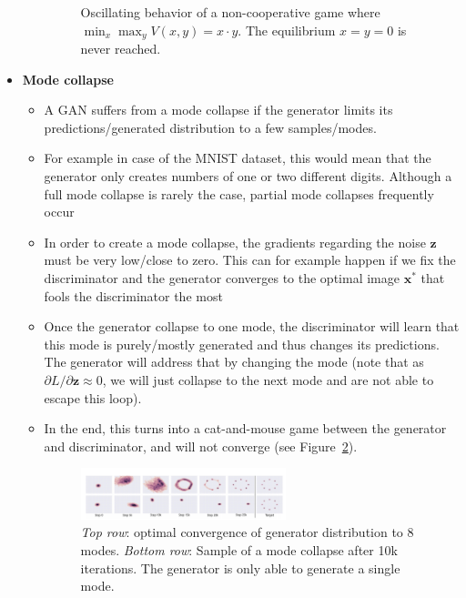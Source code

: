 \begin{itemize}
\begin{itemize}
\begin{figure}[ht!]
			\caption{Oscillating behavior of a non-cooperative game where $\min_x \max_y V(x,y) = x\cdot y$. The equilibrium $x=y=0$ is never reached.}
			\label{fig:GAN_reaching_equilibrium}
		\end{figure}
	\end{itemize}
	\item \textbf{Mode collapse}
	\begin{itemize}
		\item A GAN suffers from a mode collapse if the generator limits its predictions/generated distribution to a few samples/modes.
		\item For example in case of the MNIST dataset, this would mean that the generator only creates numbers of one or two different digits. Although a full mode collapse is rarely the case, partial mode collapses frequently occur
		\item In order to create a mode collapse, the gradients regarding the noise $\bm{z}$ must be very low/close to zero. This can for example happen if we fix the discriminator and the generator converges to the optimal image $\bm{x}^*$ that fools the discriminator the most
		\item Once the generator collapse to one mode, the discriminator will learn that this mode is purely/mostly generated and thus changes its predictions. The generator will address that by changing the mode (note that as $\partial L/\partial \bm{z}\approx 0$, we will just collapse to the next mode and are not able to escape this loop).
		\item In the end, this turns into a cat-and-mouse game between the generator and discriminator, and will not converge (see Figure~\ref{fig:GAN_mode_collapse}).
		\begin{figure}[ht!]
			\centering
			\includegraphics[width=0.6\textwidth]{figures/cv_deep_learning_GAN_mode_collapse.png}
			\caption{\textit{Top row}: optimal convergence of generator distribution to 8 modes. \textit{Bottom row}: Sample of a mode collapse after 10k iterations. The generator is only able to generate a single mode.}
			\label{fig:GAN_mode_collapse}
		\end{figure}
	\end{itemize}
\end{itemize}